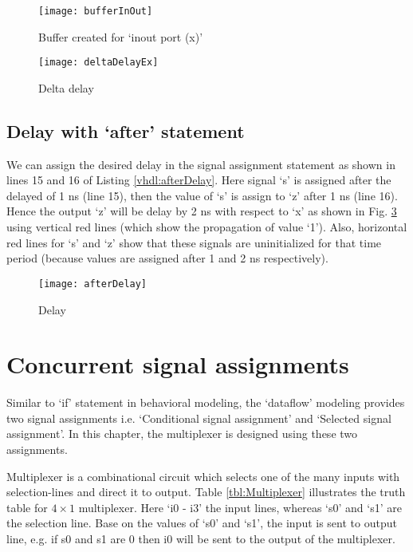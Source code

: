 \begin{figure}[!h]
	\centering
	\texttt{[image: bufferInOut]}
	\caption{Buffer created for `inout port (x)'}
	\label{fig:bufferInOut}
\end{figure}



\begin{figure}[!h]
	\centering
	\texttt{[image: deltaDelayEx]}
	\caption{Delta delay}
	\label{fig:deltaDelayEx}
\end{figure}

\subsection{Delay with `after' statement}
We can assign the desired delay in the signal assignment statement as shown in lines 15 and 16 of Listing \ref{vhdl:afterDelay}. Here signal `s' is assigned after the delayed of 1 ns (line 15), then the value of `s' is assign to `z' after 1 ns (line 16). Hence the output `z' will be delay by 2 ns with respect to `x' as shown in Fig. \ref{fig:afterDelay} using vertical red lines (which show the propagation of value `1'). Also, horizontal red lines for `s' and `z' show that these signals are uninitialized for that time period (because values are assigned after 1 and 2 ns respectively). 




\begin{figure}[!h]
	\centering
	\texttt{[image: afterDelay]}
	\caption{Delay}
	\label{fig:afterDelay}
\end{figure}

\section{Concurrent signal assignments}
Similar to `if' statement in behavioral modeling, the `dataflow' modeling provides two signal assignments i.e. `Conditional signal assignment' and `Selected signal assignment'. In this chapter, the multiplexer is designed using these two assignments. 

Multiplexer is a combinational circuit which selects one of the many inputs with selection-lines and direct it to output. Table \ref{tbl:Multiplexer} illustrates the truth table for $4\times 1$ multiplexer. Here `i0 - i3' the input lines, whereas `s0' and `s1' are the selection line. Base on the values of `s0' and `s1', the input is sent to output line, e.g. if s0 and s1 are 0 then i0 will be sent to the output of the multiplexer.

